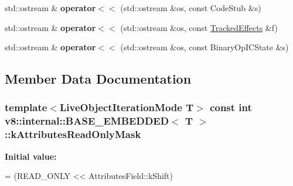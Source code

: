 \begin{DoxyCompactItemize}
\item 
std\+::ostream \& {\bfseries operator$<$$<$} (std\+::ostream \&os, const Code\+Stub \&s)\hypertarget{classv8_1_1internal_1_1_b_a_s_e___e_m_b_e_d_d_e_d_a339c419cc6fc0e8026ac8dc8fa59a98c}{}\label{classv8_1_1internal_1_1_b_a_s_e___e_m_b_e_d_d_e_d_a339c419cc6fc0e8026ac8dc8fa59a98c}

\item 
std\+::ostream \& {\bfseries operator$<$$<$} (std\+::ostream \&os, const \hyperlink{structv8_1_1internal_1_1_tracked_effects}{Tracked\+Effects} \&f)\hypertarget{classv8_1_1internal_1_1_b_a_s_e___e_m_b_e_d_d_e_d_a35d8d0864a4b716e33bacaf67634607f}{}\label{classv8_1_1internal_1_1_b_a_s_e___e_m_b_e_d_d_e_d_a35d8d0864a4b716e33bacaf67634607f}

\item 
std\+::ostream \& {\bfseries operator$<$$<$} (std\+::ostream \&os, const Binary\+Op\+I\+C\+State \&s)\hypertarget{classv8_1_1internal_1_1_b_a_s_e___e_m_b_e_d_d_e_d_aaf30f7c01c1cf98156e9a2ac57514756}{}\label{classv8_1_1internal_1_1_b_a_s_e___e_m_b_e_d_d_e_d_aaf30f7c01c1cf98156e9a2ac57514756}

\end{DoxyCompactItemize}


\subsection{Member Data Documentation}
\subsubsection[{\texorpdfstring{k\+Attributes\+Read\+Only\+Mask}{kAttributesReadOnlyMask}}]{\setlength{\rightskip}{0pt plus 5cm}template$<$Live\+Object\+Iteration\+Mode T$>$ const int {\bf v8\+::internal\+::\+B\+A\+S\+E\+\_\+\+E\+M\+B\+E\+D\+D\+ED}$<$ T $>$\+::k\+Attributes\+Read\+Only\+Mask\hspace{0.3cm}{\ttfamily [static]}}\hypertarget{classv8_1_1internal_1_1_b_a_s_e___e_m_b_e_d_d_e_d_a9a84337bc4ecd6f67d914fb4ed2eb2eb}{}\label{classv8_1_1internal_1_1_b_a_s_e___e_m_b_e_d_d_e_d_a9a84337bc4ecd6f67d914fb4ed2eb2eb}
{\bfseries Initial value\+:}
\begin{DoxyCode}
=
      (READ\_ONLY << AttributesField::kShift)
\end{DoxyCode}
